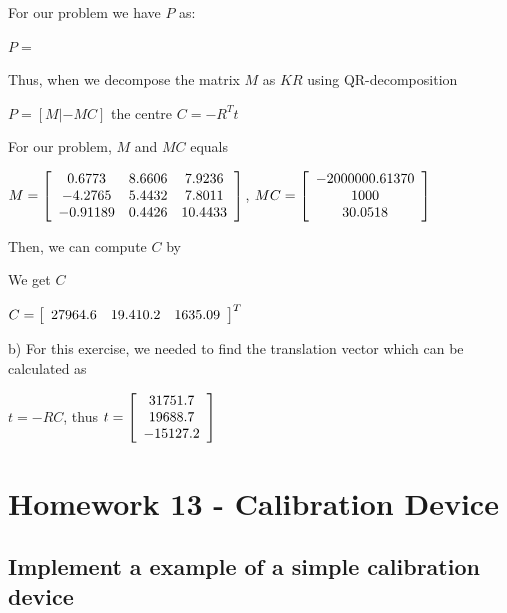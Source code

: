 \documentclass[]{article}
\begin{document}
For our problem we have $P$ as:

\centerline {
	$P = $
}

Thus, when we decompose the matrix $M$ as $KR$ using QR-decomposition 

\centerline {
	$P = [M| -MC]$ the centre $C = -R^Tt$
}

For our problem, $M$ and $MC$ equals 

\centerline {
	$M = \left[ {\begin{array}{*{20}c}
		0.6773 & 8.6606 & 7.9236 \\
		-4.2765 & 5.4432 & 7.8011 \\ 
		-0.91189 & 0.4426 & 10.4433     
		\end{array} } \right]$, $MC = \left[ {\begin{array}{*{20}c}
		-2000000.61370 \\
		1000 \\ 
		30.0518     
		\end{array} } \right] $
}

Then, we can compute $C$ by



We get  $C$ 

\centerline {
	$C = \left[ {\begin{array}{*{20}c}
		27964.6 &  19.410.2 & 1635.09   
		\end{array} } \right]^T$
}

b) For this exercise, we needed to find the translation vector which can be calculated as 

\centerline {
	$t = -RC$, thus $t =\left[ {\begin{array}{*{20}c}
		31751.7 \\
		19688.7 \\ 
		-15127.2   
		\end{array} } \right] $
}


\section{Homework 13 - Calibration Device }
\subsection{Implement a example of a simple calibration device}
\end{document}
